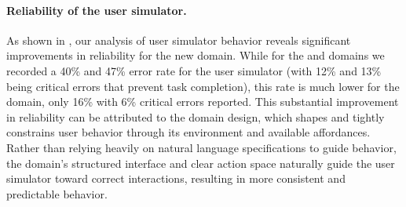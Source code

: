 \paragraph{Reliability of the user simulator.}
\label{sec:user-sim-quality}



As shown in , our analysis of user simulator behavior reveals significant improvements in reliability for the new \telecom domain. While for the \retail and \airline domains we recorded a 40\% and 47\% error rate for the user simulator (with 12\% and 13\% being critical errors that prevent task completion), this rate is much lower for the \telecom domain, only 16\% with 6\% critical errors reported. This substantial improvement in reliability can be attributed to the domain design, which shapes and tightly constrains user behavior through its environment and available affordances. Rather than relying heavily on natural language specifications to guide behavior, the \telecom domain's structured interface and clear action space naturally guide the user simulator toward correct interactions, resulting in more consistent and predictable behavior.
